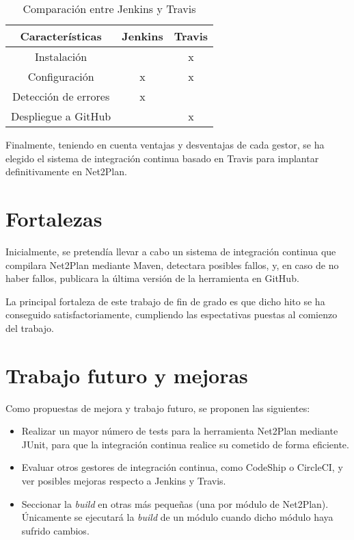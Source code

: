 \vspace*{0.45in}


\begin{table}[h!]
	\centering
	\resizebox{10cm}{!} {
		\begin{tabular}{||c||c||c||}
			\hline 
			Características & Jenkins & Travis  \\ 
			\hline 
			Instalación &  & x\\ 
			\hline 
			Configuración & x & x \\ 
			\hline 
			Detección de errores & x &  \\ 
			\hline 
			Despliegue a GitHub &  & x \\ 
			\hline 
		\end{tabular} 
	}
	\caption{Comparación entre Jenkins y Travis}
	\label{comparacion}
\end{table}

Finalmente, teniendo en cuenta ventajas y desventajas de cada gestor, se ha elegido el sistema de integración continua basado en Travis para implantar definitivamente en Net2Plan.

\section{Fortalezas}

Inicialmente, se pretendía llevar a cabo un sistema de integración continua que compilara Net2Plan mediante Maven, detectara posibles fallos, y, en caso de no haber fallos, publicara la última versión de la herramienta en GitHub.

La principal fortaleza de este trabajo de fin de grado es que dicho hito se ha conseguido satisfactoriamente, cumpliendo las espectativas puestas al comienzo del trabajo.

\section{Trabajo futuro y mejoras}

Como propuestas de mejora y trabajo futuro, se proponen las siguientes:
\begin{itemize}
	\item Realizar un mayor número de tests para la herramienta Net2Plan mediante JUnit, para que la integración continua realice su cometido de forma eficiente.
	\item Evaluar otros gestores de integración continua, como CodeShip o CircleCI, y ver posibles mejoras respecto a Jenkins y Travis.
	\item Seccionar la \textit{build} en otras más pequeñas (una por módulo de Net2Plan). Únicamente se ejecutará la \textit{build} de un módulo cuando dicho módulo haya sufrido cambios.  
\end{itemize}

\cleardoublepage